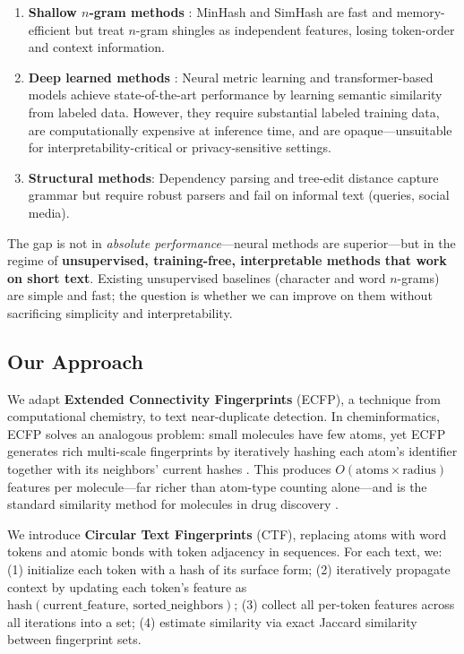 \documentclass[11pt,letterpaper]{article}
\begin{document}
\begin{enumerate}
  \item \textbf{Shallow $n$-gram methods} \citep{Broder1997, Broder2000}: MinHash and SimHash are fast and memory-efficient but treat $n$-gram shingles as independent features, losing token-order and context information.

  \item \textbf{Deep learned methods} \citep{Devlin2019, Hu2019}: Neural metric learning and transformer-based models achieve state-of-the-art performance by learning semantic similarity from labeled data. However, they require substantial labeled training data, are computationally expensive at inference time, and are opaque---unsuitable for interpretability-critical or privacy-sensitive settings.

  \item \textbf{Structural methods}: Dependency parsing and tree-edit distance capture grammar but require robust parsers and fail on informal text (queries, social media).
\end{enumerate}

The gap is not in \emph{absolute performance}---neural methods are superior---but in the regime of \textbf{unsupervised, training-free, interpretable methods that work on short text}. Existing unsupervised baselines (character and word $n$-grams) are simple and fast; the question is whether we can improve on them without sacrificing simplicity and interpretability.

\subsection{Our Approach}

We adapt \textbf{Extended Connectivity Fingerprints} (ECFP), a technique from computational chemistry, to text near-duplicate detection. In cheminformatics, ECFP solves an analogous problem: small molecules have few atoms, yet ECFP generates rich multi-scale fingerprints by iteratively hashing each atom's identifier together with its neighbors' current hashes \citep{Rogers2010, Hahn2013}. This produces $O(\text{atoms} \times \text{radius})$ features per molecule---far richer than atom-type counting alone---and is the standard similarity method for molecules in drug discovery \citep{Hahn2013, Maggiora2014}.

We introduce \textbf{Circular Text Fingerprints} (CTF), replacing atoms with word tokens and atomic bonds with token adjacency in sequences. For each text, we: (1) initialize each token with a hash of its surface form; (2) iteratively propagate context by updating each token's feature as $\text{hash}(\text{current\_feature},\,\text{sorted\_neighbors})$; (3) collect all per-token features across all iterations into a set; (4) estimate similarity via exact Jaccard similarity between fingerprint sets.
\end{document}
